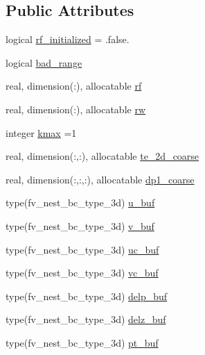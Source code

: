 \subsection*{Public Attributes}
\begin{DoxyCompactItemize}
\item 
logical \hyperlink{classfv__nesting__mod_a98a38c57118fae2095e4a502840edc87}{rf\-\_\-initialized} = .false.
\item 
logical \hyperlink{classfv__nesting__mod_a6b3b4dfb2f4f57efd0b8ff7ba401b9bc}{bad\-\_\-range}
\item 
real, dimension(\-:), allocatable \hyperlink{classfv__nesting__mod_a702e9b795503ff62634ce6101630bf11}{rf}
\item 
real, dimension(\-:), allocatable \hyperlink{classfv__nesting__mod_a762ae685097064afedcd7fdb8724453a}{rw}
\item 
integer \hyperlink{classfv__nesting__mod_af15ee2132be14b98ebf846e337d494f4}{kmax} =1
\item 
real, dimension(\-:,\-:), allocatable \hyperlink{classfv__nesting__mod_adbed3c960cd1c9a05ea941ec468224a3}{te\-\_\-2d\-\_\-coarse}
\item 
real, dimension(\-:,\-:,\-:), allocatable \hyperlink{classfv__nesting__mod_a784b3cab4ca871ca0f9cb4935c3195bc}{dp1\-\_\-coarse}
\item 
type(fv\-\_\-nest\-\_\-bc\-\_\-type\-\_\-3d) \hyperlink{classfv__nesting__mod_a23ef282a2b544e33d2a2f480173fa7cc}{u\-\_\-buf}
\item 
type(fv\-\_\-nest\-\_\-bc\-\_\-type\-\_\-3d) \hyperlink{classfv__nesting__mod_a477f9eccd84b2121d316306990d4c277}{v\-\_\-buf}
\item 
type(fv\-\_\-nest\-\_\-bc\-\_\-type\-\_\-3d) \hyperlink{classfv__nesting__mod_af94489e73fc64a474de665ee71a17334}{uc\-\_\-buf}
\item 
type(fv\-\_\-nest\-\_\-bc\-\_\-type\-\_\-3d) \hyperlink{classfv__nesting__mod_ad04b4ce86437a1860b2c7f577af68f2c}{vc\-\_\-buf}
\item 
type(fv\-\_\-nest\-\_\-bc\-\_\-type\-\_\-3d) \hyperlink{classfv__nesting__mod_a307ae066e30400f6e6d9839b04193cf3}{delp\-\_\-buf}
\item 
type(fv\-\_\-nest\-\_\-bc\-\_\-type\-\_\-3d) \hyperlink{classfv__nesting__mod_a3c14974429affc9b0ccdbb8e38813e72}{delz\-\_\-buf}
\item 
type(fv\-\_\-nest\-\_\-bc\-\_\-type\-\_\-3d) \hyperlink{classfv__nesting__mod_abe6a968e2acd11ea1839969781f8b189}{pt\-\_\-buf}
\item 

\end{DoxyCompactItemize}
